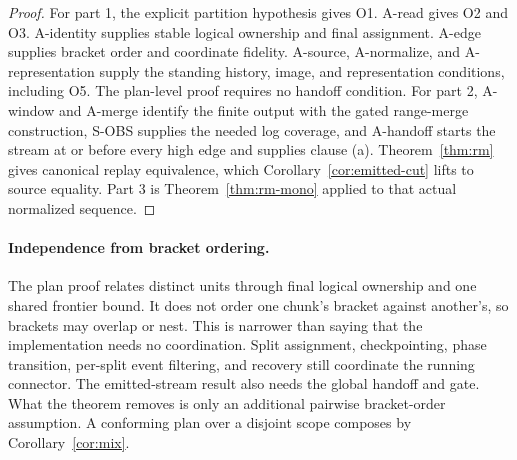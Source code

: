 \documentclass[sigconf,nonacm,10pt]{acmart}
\theoremstyle{plain}
\theoremstyle{definition}
\begin{document}
\begin{proof}
For part 1, the explicit partition hypothesis gives O1. A-read gives O2
and O3. A-identity supplies stable logical ownership and final
assignment. A-edge supplies bracket order and coordinate fidelity.
A-source, A-normalize, and A-representation supply the standing history,
image, and representation conditions, including O5. The plan-level proof requires 
no handoff condition. For part 2, A-window and A-merge identify the finite output
with the gated range-merge construction, S-OBS supplies the needed log
coverage, and A-handoff starts the stream at or before every high edge
and supplies clause (a). Theorem~\ref{thm:rm} gives canonical replay
equivalence, which Corollary~\ref{cor:emitted-cut} lifts to source
equality. Part 3 is Theorem~\ref{thm:rm-mono} applied to that actual
normalized sequence.
\end{proof}

\paragraph{Independence from bracket ordering.}
The plan proof relates distinct units through final logical ownership
and one shared frontier bound. It does not order one chunk's bracket
against another's, so brackets may overlap or nest. This is narrower
than saying that the implementation needs no coordination. Split
assignment, checkpointing, phase transition, per-split event filtering,
and recovery still coordinate the running connector. The emitted-stream
result also needs the global handoff and gate. What the theorem removes
is only an additional pairwise bracket-order assumption. A
conforming plan over a disjoint scope composes by
Corollary~\ref{cor:mix}.
\end{document}
